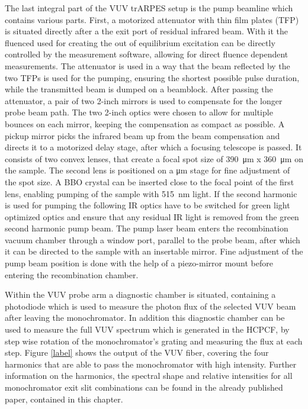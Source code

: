 The last integral part of the VUV trARPES setup is the pump beamline which contains various parts.
First, a motorized attenuator with thin film plates (TFP) is situated directly after a the exit port of residual infrared beam.
With it the fluenced used for creating the out of equilibrium excitation can be directly controlled by the measurement software, allowing for direct fluence dependent measurements.
The attenuator is used in a way that the beam reflected by the two TFPs is used for the pumping, ensuring the shortest possible pulse duration, while the transmitted beam is dumped on a beamblock.
After passing the attenuator, a pair of two 2-inch mirrors is used to compensate for the longer probe beam path.
The two 2-inch optics were chosen to allow for multiple bounces on each mirror, keeping the compensation as compact as possible.
A pickup mirror picks the infrared beam up from the beam compensation and directs it to a motorized delay stage, after which a focusing telescope is passed.
It consists of two convex lenses, that create a focal spot size of \qty{390}{\micro\meter} x \qty{360}{\micro\meter} on the sample.
The second lens is positioned on a \unit{\micro\meter} stage for fine adjustment of the spot size.
A BBO crystal can be inserted  close to the focal point of the first lens, enabling pumping of the sample with \qty{515}{\nano\meter} light.
If the second harmonic is used for pumping the following IR optics have to be switched for green light optimized optics and ensure that any residual IR light is removed from the green second harmonic pump beam.
The pump laser beam enters the recombination vacuum chamber through a window port, parallel to the probe beam, after which it can be directed to the sample with an insertable mirror.
Fine adjustment of the pump beam position is done with the help of a piezo-mirror mount before entering the recombination chamber.

Within the VUV probe arm a diagnostic chamber is situated, containing a photodiode which is used to measure the photon flux of the selected VUV beam after leaving the monochromator.
In addition this diagnostic chamber can be used to measure the full VUV spectrum which is generated in the HCPCF, by step wise rotation of the monochromator's grating and measuring the flux at each step.
Figure \ref{label} shows the output of the VUV fiber, covering the four harmonics that are able to pass the monochromator with high intensity.
Further information on the harmonics, the spectral shape and relative intensities for all monochromator exit slit combinations can be found in the already published paper, contained in this chapter.

